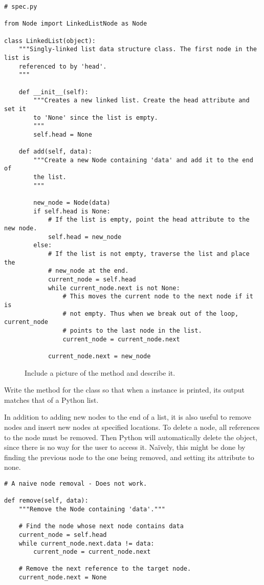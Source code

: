 \begin{lstlisting}
# spec.py

from Node import LinkedListNode as Node

class LinkedList(object):
    """Singly-linked list data structure class. The first node in the list is
    referenced to by 'head'.
	"""
	
	def __init__(self):
		"""Creates a new linked list. Create the head attribute and set it 
		to 'None' since the list is empty.
		"""
		self.head = None

	def add(self, data):
		"""Create a new Node containing 'data' and add it to the end of
		the list.
		"""

		new_node = Node(data)
		if self.head is None:
			# If the list is empty, point the head attribute to the new node.
			self.head = new_node
		else:
			# If the list is not empty, traverse the list and place the
			# new_node at the end.
			current_node = self.head
			while current_node.next is not None:
				# This moves the current node to the next node if it is
				# not empty. Thus when we break out of the loop, current_node
				# points to the last node in the list.
				current_node = current_node.next

			current_node.next = new_node
\end{lstlisting}

\begin{figure}
\centering
\caption{Include a picture of the  method and describe it.}
\label{fig:add}
\end{figure}

\begin{problem}
Write the  method for the  class so that when a  instance is printed, its output matches that of a Python list.
\end{problem}

In addition to adding new nodes to the end of a list, it is also useful to remove nodes and insert new nodes at specified locations.
To delete a node, all references to the node must be removed.
Then Python will automatically delete the object, since there is no way for the user to access it.
Na{\"i}vely, this might be done by finding the previous node to the one being removed, and setting its  attribute to none.

\begin{lstlisting}
# A naive node removal - Does not work.

def remove(self, data):
	"""Remove the Node containing 'data'."""

	# Find the node whose next node contains data
	current_node = self.head
	while current_node.next.data != data:
		current_node = current_node.next

	# Remove the next reference to the target node.
	current_node.next = None
\end{lstlisting}

